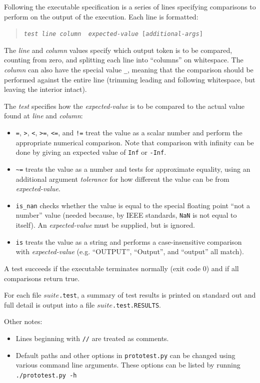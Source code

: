 \documentclass{article}
\newcommand\code[1]{\begin{quote}\var{#1}\end{quote}}
\newcommand\var[1]{{\tt #1}}
\begin{document}
Following the executable specification is a series of lines specifying
comparisons to perform on the output of the execution.  Each line is
formatted: \code{{\it test} {\it line} {\it column} {\it
    expected-value} [{\it additional-args}]}

The {\it line} and {\it column} values specify which output token is to
be compared, counting from zero, and splitting each line into
``columns'' on whitespace.  The {\it column} can also have the special
value \var{\_}, meaning that the comparison should be performed
against the entire line (trimming leading and following whitespace,
but leaving the interior intact).

The {\it test} specifies how the {\it expected-value} is to be
compared to the actual value found at {\it line} and {\it column}:
\begin{itemize}
\item \var{=}, \var{>}, \var{<}, \var{>=}, \var{<=}, and \var{!=}
  treat the value as a scalar number and perform the appropriate
  numerical comparison.  Note that comparison with infinity can be
  done by giving an expected value of \var{Inf} or \var{-Inf}.
\item \var{\textasciitilde =} treats the value as a number and tests for approximate
  equality, using an additional argument {\it tolerance} for how
  different the value can be from {\it expected-value}.
\item \var{is\_nan} checks whether the value is equal to the special
  floating point ``not a number'' value (needed because, by IEEE
  standards, \var{NaN} is not equal to itself).  An {\it
    expected-value} must be supplied, but is ignored.
\item \var{is} treats the value as a string and performs a
  case-insensitive comparison with {\it expected-value}
  (e.g. ``OUTPUT'', ``Output'', and ``output'' all match).
\end{itemize}
  
A test succeeds if the executable terminates normally (exit code 0)
and if all comparisons return true.

For each file \var{$suite$.test}, a summary of test results is printed
on standard out and full detail is output into a file
\var{$suite$.test.RESULTS}.

Other notes:
\begin{itemize}
\item Lines beginning with \var{//} are treated as comments.
\item Default paths and other options in {\tt prototest.py} can be
  changed using various command line arguments.  These options can
  be listed by running {\tt ./prototest.py -h}
\end{itemize}
\end{document}
